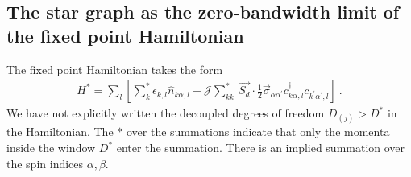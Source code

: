 \documentclass[reprint,prb,superscriptaddress]{revtex4-2}
\begin{document}
\subsection{The star graph as the zero-bandwidth limit of the fixed point Hamiltonian}
\label{sec:star graph}
The fixed point Hamiltonian takes the form
\begin{equation}\begin{aligned}
	H^* = \sum_l\left[ \sum^*_{k}\epsilon_{k,l} \hat n_{k\alpha,l} + {\mathcal{J}}\sum_{kk^\prime}^* \vec{S_d}\cdot\frac{1}{2}\vec{\sigma}_{\alpha\alpha^\prime}c_{k\alpha,l}^\dagger c_{k^\prime\alpha^\prime, l}\right]~.
\end{aligned}\end{equation}
We have not explicitly written the decoupled degrees of freedom \(D_{(j)} > D^*\) in the Hamiltonian. The \(*\) over the summations indicate that only the momenta inside the window \(D^*\) enter the summation. There is an implied summation over the spin indices \(\alpha,\beta\).
\end{document}
